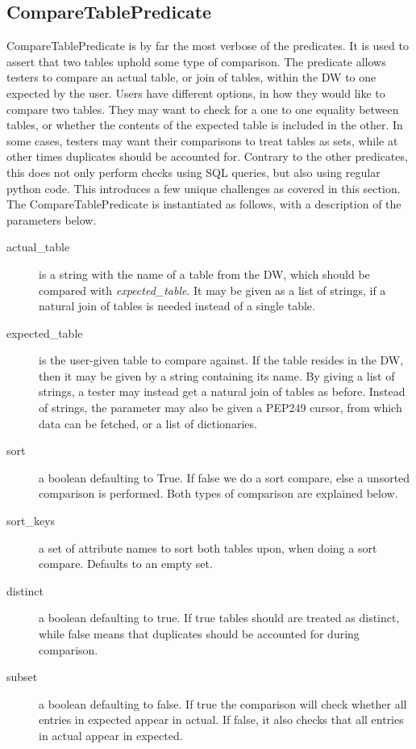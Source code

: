 \subsection{CompareTablePredicate}
CompareTablePredicate is by far the most verbose of the predicates. It is used to assert that two tables uphold some type of comparison. The predicate allows testers to compare an actual table, or join of tables, within the DW to one expected by the user. Users have different options, in how they would like to compare two tables. They may want to check for a one to one equality between tables, or whether the contents of the expected table is included in the other. In some cases, testers may want their comparisons to treat tables as sets, while at other times duplicates should be accounted for. Contrary to the other predicates, this does not only perform checks using SQL queries, but also using regular python code. This introduces a few unique challenges as covered in this section. The CompareTablePredicate is instantiated as follows, with a description of the parameters below.


\begin{description}
\item [actual\_table] is a string with the name of a table from the DW, which should be compared with \textit{expected\_table}. It may be given as a list of strings, if a natural join of tables is needed instead of a single table.
\item [expected\_table] is the user-given table to compare against. If the table resides in the DW, then it may be given by a string containing its name. By giving a list of strings, a tester may instead get a natural join of tables as before. Instead of strings, the parameter may also be given a PEP249 cursor, from which data can be fetched, or a list of dictionaries.
\item [sort] a boolean defaulting to True. If false we do a sort compare, else a unsorted comparison is performed. Both types of comparison are explained below.
\item [sort\_keys] a set of attribute names to sort both tables upon, when doing a sort compare. Defaults to an empty set.
\item [distinct] a boolean defaulting to true. If true tables should are treated as distinct, while false means that duplicates should be accounted for during comparison.
\item [subset] a boolean defaulting to false. If true the comparison will check whether all entries in expected appear in actual. If false, it also checks that all entries in actual appear in expected.
\end{description}

